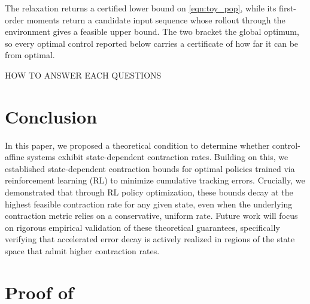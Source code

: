 \documentclass[lettersize,journal]{IEEEtran}
\begin{document}
The relaxation returns a certified lower bound on \eqref{eqn:toy_pop}, 
while its first-order moments return a candidate input sequence 
whose rollout through the environment gives a feasible upper bound. 
The two bracket the global optimum, so every optimal control reported below 
carries a certificate of how far it can be from optimal.



HOW TO ANSWER EACH QUESTIONS


\section{Conclusion}
In this paper, we proposed a theoretical condition to determine whether control-affine systems exhibit state-dependent contraction rates. Building on this, we established state-dependent contraction bounds for optimal policies trained via reinforcement learning (RL) to minimize cumulative tracking errors. Crucially, we demonstrated that through RL policy optimization, these bounds decay at the highest feasible contraction rate for any given state, even when the underlying contraction metric relies on a conservative, uniform rate. Future work will focus on rigorous empirical validation of these theoretical guarantees, specifically verifying that accelerated error decay is actively realized in regions of the state space that admit higher contraction rates.




\appendices

\section{Proof of }\label{app:proof_theorem1}
\end{document}
